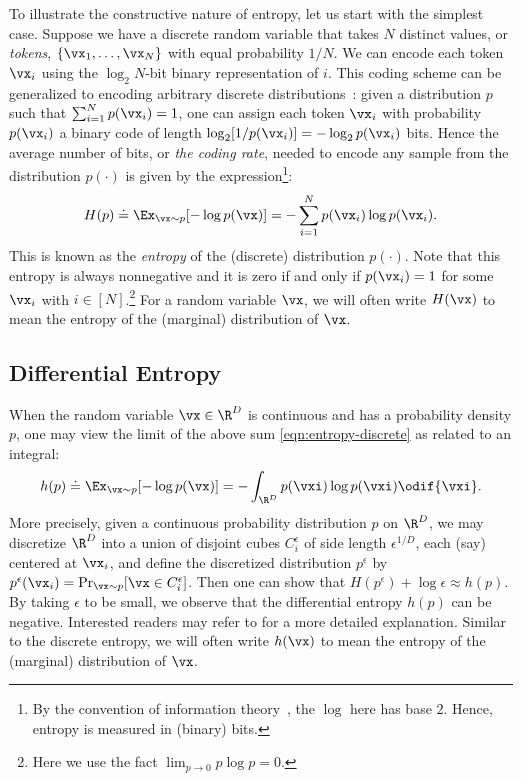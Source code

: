 \documentclass[../../book-main.tex]{subfiles}
\begin{document}
To illustrate the constructive nature of entropy, let us start with
the simplest case. Suppose we have a discrete random variable
that takes \(N\) distinct values, or \textit{tokens}, \(\{\vx_{1},
\dots, \vx_{N}\}\) with equal probability \(1/N\). We can
encode each token \(\vx_{i}\) using the \(\log_{2} N\)-bit binary
representation of \(i\). This coding scheme can be generalized to
encoding arbitrary discrete distributions~\cite{Cover-Thomas}: given
a distribution \(p\) such that \(\sum_{i=1}^{N} p(\vx_{i}) = 1\), one
can assign each token \(\vx_{i}\) with probability \(p(\vx_{i})\)
a binary code of length \(\log_{2} [1/p(\vx_{i})] = - \log_{2}
p(\vx_{i})\) bits. Hence the average number of bits, or \textit{the
coding rate}, needed to encode any sample from the distribution
\(p(\cdot)\) is given by the expression\footnote{By the convention
    of information theory~\cite{Cover-Thomas}, the \(\log\) here has
base \(2\). Hence, entropy is measured in (binary) bits.}:
\begin{equation}
    H(p) \doteq \Ex_{\vx \sim p}[-\log p(\vx)] = - \sum_{i=1}^{N}
    p(\vx_{i}) \log p(\vx_{i}).
    \label{eqn:entropy-discrete}
\end{equation}
This is known as the \textit{entropy} of the (discrete) distribution
\(p(\cdot)\). Note that this entropy is always nonnegative and it is
zero if and only if \(p(\vx_{i}) = 1\) for some \(\vx_{i}\) with \(i
\in [N]\).\footnote{Here we use the fact
\(\lim_{p \to 0} p \log p = 0\).} For a random variable
\(\vx\), we will often write \(H(\vx)\) to mean the entropy of the
(marginal) distribution of \(\vx\).

\subsection{Differential Entropy}

When the random variable \(\vx \in \R^{D}\) is continuous and has a
probability density \(p\), one may view the limit of the above
sum \eqref{eqn:entropy-discrete} as related to an integral:
\begin{equation}
    h(p) \doteq \Ex_{\vx \sim p}[-\log p(\vx)] = - \int_{\R^{D}}
    p(\vxi) \log p(\vxi) \odif{\vxi}.
    \label{eqn:entropy-differential}
\end{equation}
More precisely, given a continuous probability distribution \(p\) on
\(\R^{D}\), we may discretize \(\R^{D}\) into a union of disjoint
cubes \(C_{i}^{\epsilon}\) of side length \(\epsilon^{1/D}\), each (say)
centered at \(\vx_{i}\), and define the discretized distribution
\(p^{\epsilon}\) by \(p^{\epsilon}(\vx_{i}) = \Pr_{\vx \sim p}[\vx
\in C_{i}^{\epsilon}]\). Then one can show that \(H(p^{\epsilon}) +
\log \epsilon \approx h(p)\). By taking \(\epsilon\) to be small, we
observe that the differential entropy \(h(p)\) can be negative.
Interested readers may refer to \cite{Cover-Thomas} for a more
detailed explanation. Similar to the discrete entropy, we will often
write \(h(\vx)\) to mean the entropy of the (marginal) distribution of \(\vx\).
\end{document}
